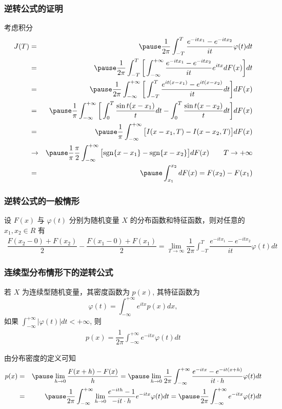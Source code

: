 \documentclass[Prob-All.tex]{subfiles}
\begin{document}
\begin{frame}
	\frametitle{逆转公式的证明}
	\vspace{-0.2cm}
	\zheng 考虑积分
	\begin{eqnarray*}
		J(T)&=&\pause \dfrac{1}{2\pi}\int_{-T}^T\dfrac{e^{-itx_1}-e^{-itx_2}}{it}\varphi(t)dt\\
		&=&\pause \dfrac{1}{2\pi}\int_{-T}^T\bigg[\int_{-\infty}^{+\infty}\dfrac{e^{-itx_1}-e^{-itx_2}}{it}e^{itx}dF(x)\bigg]dt\\
		&=&\pause \dfrac{1}{2\pi}\int_{-\infty}^{+\infty}\bigg[\int_{-T}^T\dfrac{e^{it(x-x_1)}-e^{it(x-x_2)}}{it}dt\bigg]dF(x)\\
		&=&\pause \dfrac{1}{\pi}\int_{-\infty}^{+\infty}\bigg[\int_0^T\dfrac{\sin t(x-x_1)}{t}dt-\int_0^T\dfrac{\sin t(x-x_2)}{t}dt\bigg]dF(x)\\
		&=&\pause \dfrac{1}{\pi}\int_{-\infty}^{+\infty}\big[I(x-x_1,T)-I(x-x_2,T)\big]dF(x)\\
		&\rightarrow&\pause \dfrac{1}{\pi}\dfrac{\pi}{2}\int_{-\infty}^{+\infty}\big[{\rm sgn}\{x-x_1\}-{\rm sgn}\{x-x_2\}\big]dF(x) \qquad T\rightarrow+\infty\\
		&=&\pause     \int_{x_1}^{x_2}dF(x)=F(x_2)-F(x_1)
	\end{eqnarray*}

\end{frame}
\begin{frame}
	\frametitle{逆转公式的一般情形}
	\begin{thm}[逆转公式一般情形] 设 $F (x)$ 与 $\varphi (t)$ 分别为随机变量 $X$ 的分布函数和特征函数，则对任意的 $x_1,x_2\in R$ 有
		{\small \begin{eqnarray*}
				\dfrac{F(x_2-0)+F(x_2)}{2}-\dfrac{F(x_1-0)+F(x_1)}{2}=\lim_{T\rightarrow\infty}\dfrac{1}{2\pi}\int_{-T}^T\dfrac{e^{-itx_1}-e^{-itx_2}}{it}\varphi(t)dt
		\end{eqnarray*}}
	\end{thm}
\end{frame}
\begin{frame}
	\frametitle{连续型分布情形下的逆转公式}
	\begin{thm}
		若 $X$ 为连续型随机变量，其密度函数为 $p (x)$, 其特征函数为
		\[\varphi(t)=\int_{-\infty}^{+\infty}e^{itx}p(x)dx,\]
		如果 $\int_{-\infty}^{+\infty}|\varphi (t)|dt<+\infty$, 则
		\begin{eqnarray*}
			p(x)=\dfrac{1}{2\pi}\int_{-\infty}^{+\infty}e^{-itx}\varphi(t)dt
		\end{eqnarray*}
	\end{thm}
	\pause \zheng 由分布密度的定义可知
	\begin{eqnarray*}
		p(x)&=&\pause \lim_{h\rightarrow 0}\dfrac{F(x+h)-F(x)}{h}=\pause \lim_{h\rightarrow 0}\dfrac{1}{2\pi}\int_{-\infty}^{+\infty}\dfrac{e^{-itx}-e^{-it(x+h)}}{it\cdot h}\varphi(t)dt\\
		&=&\pause\dfrac{1}{2\pi}\int_{-\infty}^{+\infty} \lim_{h\rightarrow 0}\dfrac{e^{-ith}-1}{-it\cdot h}e^{-itx}\varphi(t)dt=\pause \dfrac{1}{2\pi}\int_{-\infty}^{+\infty}e^{-itx}\varphi(t)dt
	\end{eqnarray*}
\end{frame}
\end{document}

